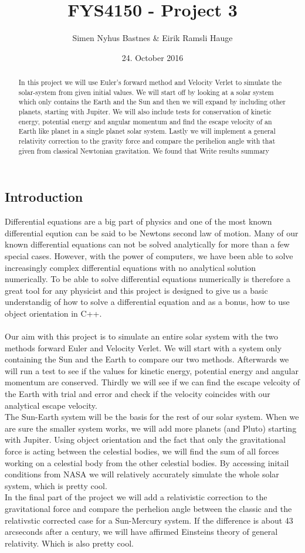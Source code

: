 \documentclass{article}
\title{FYS4150 - Project 3}
\author{Simen Nyhus Bastnes \& Eirik Ramsli Hauge}
\date{24. October 2016}
\newcommand{\husk}[1]{\color{red} #1 \color{black}}
\begin{document}
\maketitle
\begin{abstract}
In this project we will use Euler's forward method and Velocity Verlet to simulate the solar-system from given initial values. We will start off by looking at a solar system which only contains the Earth and the Sun and then we will expand by including other planets, starting with Jupiter. We will also include tests for conservation of kinetic energy, potential energy and angular momentum and find the escape velocity of an Earth like planet in a single planet solar system. Lastly we will implement a general relativity correction to the gravity force and compare the perihelion angle with that given from classical Newtonian gravitation. We found that \husk{Write results summary}
\end{abstract}
\subsection{Introduction}
Differential equations are a big part of physics and one of the most known differential eqution can be said to be Newtons second law of motion. Many of our known differential equations can not be solved analytically for more than a few special cases. However, with the power of computers, we have been able to solve increasingly complex differential equations with no analytical solution numerically. To be able to solve differential equations numerically is therefore a great tool for any physicist and this project is designed to give us a basic understandig of how to solve a differential equation and as a bonus, how to use object orientation in C++. \\ \\
Our aim with this project is to simulate an entire solar system with the two methods forward Euler and Velocity Verlet. We will start with a system only containing the Sun and the Earth to compare our two methods. Afterwards we will run a test to see if the values for kinetic energy, potential energy and angular momentum are conserved. Thirdly we will see if we can find the escape velcoity of the Earth with trial and error and check if the velocity coincides with our analytical escape velocity. \\
The Sun-Earth system will be the basis for the rest of our solar system. When we are sure the smaller system works, we will add more planets (and Pluto) starting with Jupiter. Using object orientation and the fact that only the gravitational force is acting between the celestial bodies, we will find the sum of all forces working on a celestial body from the other celestial bodies. By accessing initail conditions from NASA we will relatively accurately simulate the whole solar system, which is pretty cool. \\
In the final part of the project we will add a relativistic correction to the gravitational force and compare the perhelion angle between the classic and the relativstic corrected case for a Sun-Mercury system. If the difference is about 43 arcseconds after a century, we will have affirmed Einsteins theory of general relativity. Which is also pretty cool.
\end{document}
